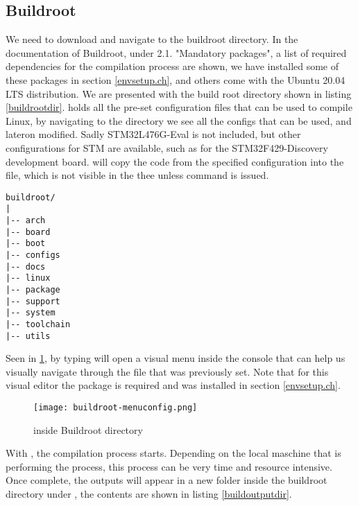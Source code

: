\subsection{Buildroot}
We need to download and navigate to the buildroot directory. In the documentation of Buildroot, under 2.1. "Mandatory packages", a list of required dependencies for the compilation process are shown, we have installed some of these packages in section \ref{envsetup.ch}, and others come with the Ubuntu 20.04 LTS distribution. We are presented with the build root directory shown in listing \ref{buildrootdir}.  holds all the pre-set configuration files that can be used to compile Linux, by navigating to the directory we see all the configs that can be used, and lateron modified. Sadly STM32L476G-Eval is not included, but other configurations for STM are available, such as  for the STM32F429-Discovery development board.  will copy the code from the specified configuration into the  file, which is not visible in the thee unless command  is issued. 

\begin{lstlisting}[caption=Buildroot directory, label=buildrootdir]
buildroot/
|
|-- arch
|-- board
|-- boot
|-- configs
|-- docs
|-- linux
|-- package
|-- support
|-- system
|-- toolchain
|-- utils
\end{lstlisting}

Seen in \ref{fig:buildroot-menuconfig}, by typing  will open a visual menu inside the console that can help us visually navigate through the  file that was previously set. Note that for this visual editor the  package is required and was installed in section \ref{envsetup.ch}.

\begin{figure}
\centering
\texttt{[image: buildroot-menuconfig.png]}
\caption{ inside Buildroot directory}
\label{fig:buildroot-menuconfig}
\end{figure}

With , the compilation process starts. Depending on the local maschine that is performing the process, this process can be very time and resource intensive. Once complete, the outputs will appear in a new folder inside the buildroot directory under , the contents are shown in listing \ref{buildoutputdir}.

